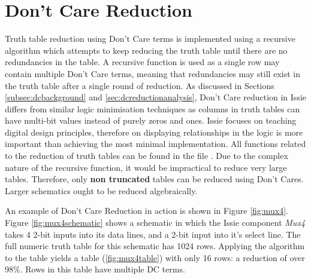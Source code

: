 \section{Don't Care Reduction}
Truth table reduction using Don't Care terms is implemented using a recursive algorithm which attempts to keep reducing the truth table until there are no redundancies in the table. A recursive function is used as a single row may contain multiple Don't Care terms, meaning that redundancies may still exist in the truth table after a single round of reduction. As discussed in Sections \ref{subsec:dcbackground} and \ref{sec:dcreductionanalysis}, Don't Care reduction in Issie differs from similar logic minimisation techniques as columns in truth tables can have multi-bit values instead of purely zeros and ones.
Issie focuses on teaching digital design principles, therefore on displaying relationships in the logic is more important than achieving the most minimal implementation. All functions related to the reduction of truth tables can be found in the file .
Due to the complex nature of the recursive function, it would be impractical to reduce very large tables. Therefore, only \textbf{non truncated} tables can be reduced using Don't Cares. Larger schematics ought to be reduced algebraically. 

An example of Don't Care Reduction in action is shown in Figure \ref{fig:mux4}. Figure \ref{fig:mux4schematic} shows a schematic in which the Issie component \textit{Mux4} takes 4 2-bit inputs into its data lines, and a 2-bit input into it's select line. The full numeric truth table for this schematic has 1024 rows. Applying the algorithm to the table yields a table (\ref{fig:mux4table}) with only 16 rows: a reduction of over 98\%. Rows in this table have multiple DC terms.

